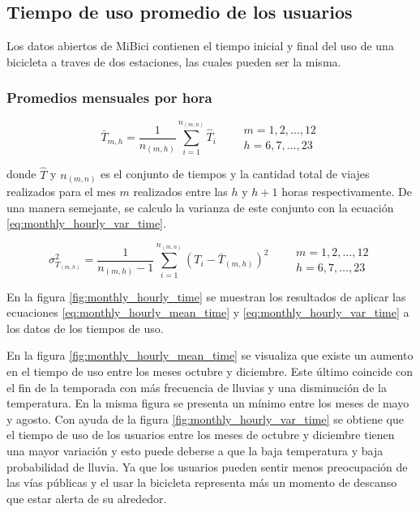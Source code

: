 \subsection{Tiempo de uso promedio de los usuarios}

Los datos abiertos de MiBici contienen el tiempo inicial y final del uso de una bicicleta a traves de dos estaciones, las cuales pueden ser la misma.

\subsubsection{Promedios mensuales por hora}


\begin{equation}
    \bar{T}_{m,h} = \frac{1}{n_{(m,h)}} \sum_{i=1}^{n_{(m,n)}} \hat{T}_{i} \qquad \begin{matrix}
        m=1,2,\dots,12 \\ h=6,7,\dots,23
    \end{matrix} \label{eq:monthly_hourly_mean_time}
\end{equation}

donde $\hat{T}$ y $n_{(m,n)}$ es el conjunto de tiempos y la cantidad total de viajes realizados para el mes $m$ realizados entre las $h$ y $h+1$ horas respectivamente. De una manera semejante, se calculo la varianza de este conjunto con la ecuación \ref{eq:monthly_hourly_var_time}.

\begin{equation}
    \sigma^2_{T_{(m,h)}} = \frac{1}{n_{(m,h)}-1} \sum_{i=1}^{n_{(m,n)}} (T_i-\bar{T}_{(m,h)})^2 \qquad \begin{matrix}
        m=1,2,\dots,12 \\ h=6,7,\dots,23
    \end{matrix} \label{eq:monthly_hourly_var_time}
\end{equation}

En la figura \ref{fig:monthly_hourly_time} se muestran los resultados de aplicar las ecuaciones \ref{eq:monthly_hourly_mean_time} y \ref{eq:monthly_hourly_var_time} a los datos de los tiempos de uso.

En la figura \ref{fig:monthly_hourly_mean_time} se visualiza que existe un aumento en el tiempo de uso entre los meses octubre y diciembre. Este último coincide con el fin de la temporada con más frecuencia de lluvias y una disminución de la temperatura\cite{clima_guadalajara}. En la misma figura se presenta un mínimo entre los meses de mayo y agosto. Con ayuda de la figura \ref{fig:monthly_hourly_var_time} se obtiene que el tiempo de uso de los usuarios entre los meses de octubre y diciembre tienen una mayor variación y esto puede deberse a que la baja temperatura y baja probabilidad de lluvia\cite{clima_guadalajara}. Ya que los usuarios pueden sentir menos preocupación de las vías públicas y el usar la bicicleta representa más un momento de descanso que estar alerta de su alrededor.

